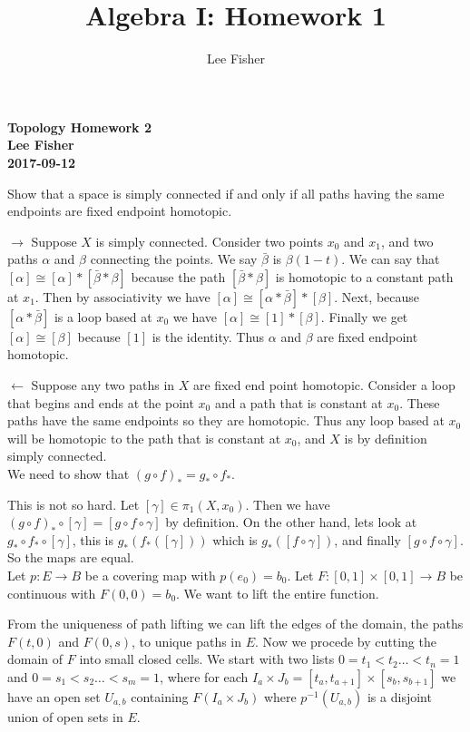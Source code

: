 \documentclass[12pt]{report}
\title{\textbf{Algebra I: Homework 1}}
\author{Lee Fisher}
\date{}
\begin{document}
\noindent \textbf{Topology Homework 2}\\
\noindent \textbf{Lee Fisher}\\
\noindent \textbf{2017-09-12}


 Show that a space is simply connected if and only if
all paths having the same endpoints are fixed endpoint homotopic.

$\rightarrow$ Suppose $X$ is simply connected. Consider two points $x_0$ and
$x_1$, and two paths $\alpha$ and $\beta$ connecting the points. We say
$\bar{\beta}$ is $\beta(1-t)$. We can say that $[\alpha] \cong [\alpha] *
[\bar{\beta} * \beta]$ because the path $[\bar{\beta} * \beta]$ is homotopic to
a constant path at $x_1$. Then by associativity we have $[\alpha] \cong [\alpha
* \bar{\beta}] * [\beta]$. Next, because $[\alpha *\bar{\beta}]$ is a loop
based at $x_0$ we have $[\alpha] \cong [1] * [\beta]$. Finally we get $[\alpha]
\cong [\beta]$ because $[1]$ is the identity. Thus $\alpha$ and $\beta$ are
fixed endpoint homotopic.

$\leftarrow$ Suppose any two paths in $X$ are fixed end point homotopic.
Consider a loop that begins and ends at the point $x_0$ and a path that is
constant at $x_0$. These paths have the same endpoints so they are homotopic.
Thus any loop based at $x_0$ will be homotopic to the path that is constant at
$x_0$, and $X$ is by definition simply connected.\\

 We need to show that $(g \circ f)_* = g_* \circ f_*$.

This is not so hard. Let $[\gamma] \in \pi_1(X,x_0)$. Then we have $(g \circ
f)_* \circ [\gamma] = [g \circ f \circ \gamma]$ by definition. On the other
hand, lets look at $g_* \circ f_* \circ [\gamma]$, this is $g_* (f_*([\gamma]))$
which is $g_*([f \circ \gamma])$, and finally $[g \circ f \circ \gamma]$. So the
maps are equal.\\

 Let $p:E \to B$ be a covering map with $p(e_0) =
b_0$. Let $F:[0,1]\times [0,1] \to B$ be continuous with $F(0,0) = b_0$. We want
to lift the entire function.

From the uniqueness of path lifting we can lift the edges of the domain, the
paths $F(t,0)$ and $F(0,s)$, to unique paths in $E$. Now we procede by cutting
the domain of $F$ into small closed cells. We start with two lists $0=t_1 < t_2
\dots < t_n = 1$ and $0 = s_1 < s_2 \dots < s_m =1$, where for each $I_a \times
J_b = [t_a,t_{a+1}] \times [s_b,s_{b+1}]$ we have an open set $U_{a,b}$
containing $F(I_a \times J_b)$ where $p^{-1}(U_{a,b})$ is a disjoint union of
open sets in $E$.
\end{document}
